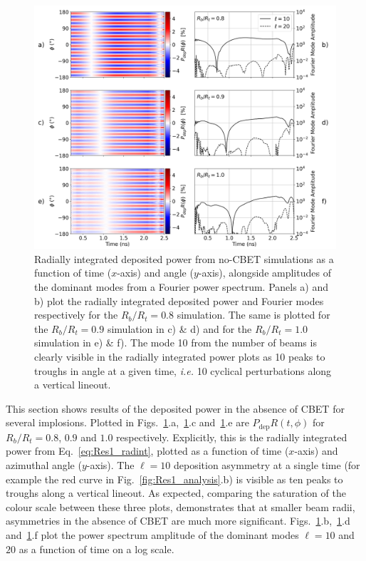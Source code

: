 \begin{figure}[t!]
    \includegraphics[width=\linewidth]{Results1/Images/noCBET_PR_modes.png}
    \centering
    \caption{Radially integrated deposited power from no-\ac{CBET} simulations as a function of time ($x$-axis) and angle ($y$-axis), alongside amplitudes of the dominant modes from a Fourier power spectrum.
    Panels a) and b) plot the radially integrated deposited power and Fourier modes respectively for the $R_b/R_t=0.8$ simulation.
    The same is plotted for the $R_b/R_t=0.9$ simulation in c) \& d) and for the $R_b/R_t=1.0$ simulation in e) \& f).
    The mode 10 from the number of beams is clearly visible in the radially integrated power plots as 10 peaks to troughs in angle at a given time, \textit{i.e.} 10 cyclical perturbations along a vertical lineout.}%
    \label{fig:Res1_PR_noCBET_modes}
\end{figure}

This section shows results of the deposited power in the absence of \ac{CBET} for several implosions.
Plotted in Figs.~\ref{fig:Res1_PR_noCBET_modes}.a,~\ref{fig:Res1_PR_noCBET_modes}.c and~\ref{fig:Res1_PR_noCBET_modes}.e are $P_{\text{dep}}R(t,\phi)$ for $R_b/R_t=0.8$, $0.9$ and $1.0$ respectively.
Explicitly, this is the radially integrated power from Eq.~\ref{eq:Res1_radint}, plotted as a function of time ($x$-axis) and azimuthal angle ($y$-axis).
The $\ell=10$ deposition asymmetry at a single time (for example the red curve in Fig.~\ref{fig:Res1_analysis}.b) is visible as ten peaks to troughs along a vertical lineout.
As expected, comparing the saturation of the colour scale between these three plots, demonstrates that at smaller beam radii, asymmetries in the absence of \ac{CBET} are much more significant.
Figs.~\ref{fig:Res1_PR_noCBET_modes}.b,~\ref{fig:Res1_PR_noCBET_modes}.d and~\ref{fig:Res1_PR_noCBET_modes}.f plot the power spectrum amplitude of the dominant modes $\ell=10$ and $20$ as a function of time on a log scale.

